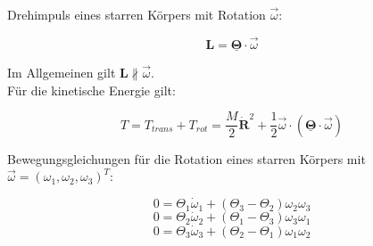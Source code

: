 \begin{framedprop}

	Drehimpuls eines starren Körpers mit Rotation $\vec{\omega}$:
	
	\[ \mathbf{L} = \mathbf{\underline \Theta} \cdot \vec{\omega} \]
	
	Im Allgemeinen gilt $\mathbf{L} \nparallel \vec{\omega}$.\\
	Für die kinetische Energie gilt:
	
	\[ T = T_{trans} + T_{rot} = \frac{M}{2} \mathbf{\dot R}^2 + \frac{1}{2} \vec{\omega} \cdot (\mathbf{\underline \Theta} \cdot \vec{\omega}) \]
	
\end{framedprop}

\begin{framedprop}

	Bewegungsgleichungen für die Rotation eines starren Körpers mit $\vec{\omega} = (\omega_1, \omega_2, \omega_3)^T$:
	
	\[ 0 = \Theta_1 \dot \omega_1 + (\Theta_3 - \Theta_2) \omega_2 \omega_3 \]
	\[ 0 = \Theta_2 \dot \omega_2 + (\Theta_1 - \Theta_3) \omega_3 \omega_1 \]
	\[ 0 = \Theta_3 \dot \omega_3 + (\Theta_2 - \Theta_1) \omega_1 \omega_2 \]
	
\end{framedprop}